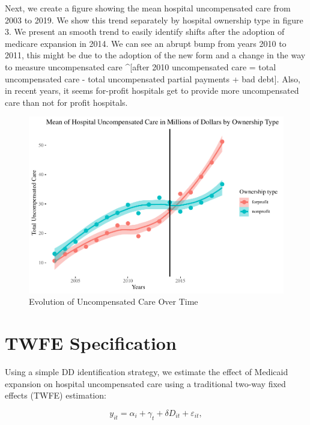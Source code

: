 \documentclass[
  12pt,
]{article}
\begin{document}
Next, we create a figure showing the mean hospital uncompensated care
from 2003 to 2019. We show this trend separately by hospital ownership
type in figure 3. We present an smooth trend to easily identify shifts
after the adoption of medicare expansion in 2014. We can see an abrupt
bump from years 2010 to 2011, this might be due to the adoption of the
new form and a change in the way to measure uncompensated care
\^{}{[}after 2010 uncompensated care = total uncompensated care - total
uncompensated partial payments + bad debt{]}. Also, in recent years, it
seems for-profit hospitals get to provide more uncompensated care than
not for profit hospitals.

\begin{figure}
\centering
\includegraphics{Report_files/figure-latex/Fig-2-1.pdf}
\caption{Evolution of Uncompensated Care Over Time}
\end{figure}

\newpage

\hypertarget{twfe-specification}{%
\section{TWFE Specification}\label{twfe-specification}}

Using a simple DD identification strategy, we estimate the effect of
Medicaid expansion on hospital uncompensated care using a traditional
two-way fixed effects (TWFE) estimation:

\begin{equation}
\label{eq:dd}
y_{it} = \alpha_{i} + \gamma_{t} + \delta D_{it} + \varepsilon_{it},
\end{equation}
\end{document}
